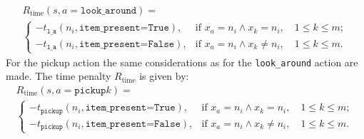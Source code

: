 \begin{multline}
    R_\text{time}(s, a=\texttt{look\_around}) = \\\begin{cases}
    -t_\texttt{l\_a}(n_i, \texttt{item\_present=True}), & \text{if }x_a=n_i \land x_k=n_i, \quad 1\leq k \leq m;\\
    -t_\texttt{l\_a}(n_i, \texttt{item\_present=False}), & \text{if }x_a=n_i \land x_k \neq n_i,\quad  1\leq k \leq m.
    \end{cases}
\end{multline}
For the pickup action  the same considerations as for the \texttt{look\_around} action are made. The time penalty $R_\text{time}$ is given by:
\begin{multline}
    R_\text{time}(s, a=\texttt{pickup}k) = \\ \begin{cases}
    -t_\texttt{pickup}(n_i, \texttt{item\_present=True}), & \text{if }x_a=n_i \land x_k=n_i, \quad 1\leq k \leq m;\\
    -t_\texttt{pickup}(n_i, \texttt{item\_present=False}), & \text{if }x_a=n_i \land x_k \neq n_i,\quad  1\leq k \leq m.
    \end{cases}
\end{multline}



